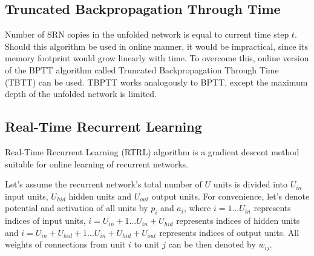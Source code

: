 \documentclass[12pt,oneside]{fithesis2}
\begin{document}

\subsection{Truncated Backpropagation Through Time}

Number of SRN copies in the unfolded network is equal to current time step $t$. Should this algorithm be used in online manner, it would be impractical, since its memory footprint would grow linearly with time. To overcome this, online version of the BPTT algorithm called Truncated Backpropagation Through Time (TBTT) can be used. TBPTT works analogously to BPTT, except the maximum depth of the unfolded network is limited.\par

\subsection{Real-Time Recurrent Learning}
Real-Time Recurrent Learning (RTRL) algorithm is a gradient descent method suitable for online learning of recurrent networks.\par

Let's assume the recurrent network's total number of $U$ units is divided into $U_{in}$ input units, $U_{hid}$ hidden units and $U_{out}$ output units. For convenience, let's denote potential and activation of all units by $p_i$ and $a_i$, where $i=1 \dots U_{in}$ represents indices of input units, $i=U_{in} + 1 \dots U_{in} + U_{hid}$ represents indices of hidden units and $i=U_{in} + U_{hid} + 1 \dots U_{in} + U_{hid} + U_{out}$ represents indices of output units. All weights of connections from unit $i$ to unit $j$ can be then denoted by $w_{ij}$.\par
\end{document}
